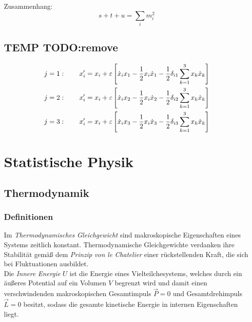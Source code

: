 \documentclass[11pt]{article}
\numberwithin{equation}{section}
\begin{document}
        Zusammenhang:
        \begin{equation}
          s+t+u = \sum_i m_i^2
        \end{equation}





        \subsection{TEMP TODO:remove}
        \begin{equation}
          \begin{aligned}
            j=1:\hspace{20pt} x_i' &= x_i + \varepsilon \left[ \dot{x}_i x_1 - \frac{1}{2}x_i \dot{x}_1 -\frac{1}{2}\delta_{i1} \sum_{k=1}^3 x_k \dot{x}_k  \right] \\
            j=2:\hspace{20pt} x_i' &= x_i + \varepsilon \left[ \dot{x}_i x_2 - \frac{1}{2}x_i \dot{x}_2 -\frac{1}{2}\delta_{i2} \sum_{k=1}^3 x_k \dot{x}_k  \right] \\
            j=3:\hspace{20pt} x_i' &= x_i + \varepsilon \left[ \dot{x}_i x_3 - \frac{1}{2}x_i \dot{x}_3 -\frac{1}{2}\delta_{i3} \sum_{k=1}^3 x_k \dot{x}_k  \right] \\
          \end{aligned}
        \end{equation}




  \newpage
  \section{Statistische Physik}
    \subsection{Thermodynamik}
      \subsubsection{Definitionen}
        Im \emph{Thermodynamisches Gleichgewicht} sind makroskopische Eigenschaften eines Systems zeitlich konstant. Thermodynamische Gleichgewichte verdanken ihre Stabilität gemäß dem \emph{Prinzip von le Chatelier} einer rückstellenden Kraft, die sich bei Fluktuationen ausbildet. \\

        Die \emph{Innere Energie} $U$ ist die Energie eines Vielteilchesystems, welches durch ein äußeres Potential auf ein Volumen $V$ begrenzt wird und damit einen verschwindenden makroskopischen Gesamtimpuls $\vec{P}=0$ und Gesamtdrehimpuls $\vec{L} = 0$ besitzt, sodass die gesamte kinetische Energie in internen Eigenschaften liegt.\\
\end{document}
